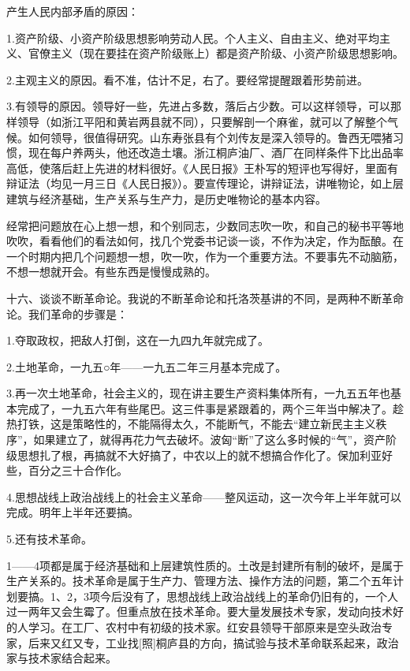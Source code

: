 产生人民内部矛盾的原因：

1.资产阶级、小资产阶级思想影响劳动人民。个人主义、自由主义、绝对平均主义、官僚主义（现在要挂在资产阶级账上）都是资产阶级、小资产阶级思想影响。

2.主观主义的原因。看不准，估计不足，右了。要经常提醒跟着形势前进。

3.有领导的原因。领导好一些，先进占多数，落后占少数。可以这样领导，可以那样领导（如浙江平阳和黄岩两县就不同），只要解剖一个麻雀，就可以了解整个气候。如何领导，很值得研究。山东寿张县有个刘传友是深入领导的。鲁西无喂猪习惯，现在每户养两头，他还改造土壤。浙江桐庐油厂、酒厂在同样条件下比出品率高低，使落后赶上先进的材料很好。《人民日报》王朴写的短评也写得好，里面有辩证法（均见一月三日《人民日报》）。要宣传理论，讲辩证法，讲唯物论，如上层建筑与经济基础，生产关系与生产力，是历史唯物论的基本内容。

经常把问题放在心上想一想，和个别同志，少数同志吹一吹，和自己的秘书平等地吹吹，看看他们的看法如何，找几个党委书记谈一谈，不作为决定，作为酝酿。在一个时期内把几个问题想一想，吹一吹，作为一个重要方法。不要事先不动脑筋，不想一想就开会。有些东西是慢慢成熟的。

十六、谈谈不断革命论。我说的不断革命论和托洛茨基讲的不同，是两种不断革命论。我们革命的步骤是：

1.夺取政权，把敌人打倒，这在一九四九年就完成了。

2.土地革命，一九五○年——一九五二年三月基本完成了。

3.再一次土地革命，社会主义的，现在讲主要生产资料集体所有，一九五五年也基本完成了，一九五六年有些尾巴。这三件事是紧跟着的，两个三年当中解决了。趁热打铁，这是策略性的，不能隔得太久，不能断气，不能去“建立新民主主义秩序”，如果建立了，就得再花力气去破坏。波匈“断”了这么多时候的“气”，资产阶级思想扎了根，再搞就不大好搞了，中农以上的就不想搞合作化了。保加利亚好些，百分之三十合作化。

4.思想战线上政治战线上的社会主义革命——整风运动，这一次今年上半年就可以完成。明年上半年还要搞。

5.还有技术革命。

1——4项都是属于经济基础和上层建筑性质的。土改是封建所有制的破坏，是属于生产关系的。技术革命是属于生产力、管理方法、操作方法的问题，第二个五年计划要搞。1、2，3项今后没有了，思想战线上政治战线上的革命仍旧有的，一个人过一两年又会生霉了。但重点放在技术革命。要大量发展技术专家，发动向技术好的人学习。在工厂、农村中有初级的技术家。红安县领导干部原来是空头政治专家，后来又红又专，工业找[照]桐庐县的方向，搞试验与技术革命联系起来，政治家与技术家结合起来。

